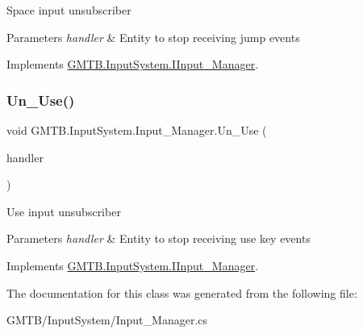 Space input unsubscriber 


\begin{DoxyParams}{Parameters}
{\em handler} & Entity to stop receiving jump events\\
\hline
\end{DoxyParams}


Implements \mbox{\hyperlink{interface_g_m_t_b_1_1_input_system_1_1_i_input___manager_a65dfb3ce87176eb4fb0a0c7342a54ade}{G\+M\+T\+B.\+Input\+System.\+I\+Input\+\_\+\+Manager}}.

\mbox{\label{class_g_m_t_b_1_1_input_system_1_1_input___manager_a176df04c04e24ecb9577789c0ff03696}} 
\subsubsection{\texorpdfstring{Un\_Use()}{Un\_Use()}}
{\footnotesize\ttfamily void G\+M\+T\+B.\+Input\+System.\+Input\+\_\+\+Manager.\+Un\+\_\+\+Use (\begin{DoxyParamCaption}\item[{Event\+Handler$<$ \mbox{\hyperlink{class_g_m_t_b_1_1_input_system_1_1_input_event}{Input\+Event}} $>$}]{handler }\end{DoxyParamCaption})}



Use input unsubscriber 


\begin{DoxyParams}{Parameters}
{\em handler} & Entity to stop receiving use key events\\
\hline
\end{DoxyParams}


Implements \mbox{\hyperlink{interface_g_m_t_b_1_1_input_system_1_1_i_input___manager_a1e9eb281683c7a6b7aa1a73da1853941}{G\+M\+T\+B.\+Input\+System.\+I\+Input\+\_\+\+Manager}}.



The documentation for this class was generated from the following file\+:\begin{DoxyCompactItemize}
\item 
G\+M\+T\+B/\+Input\+System/Input\+\_\+\+Manager.\+cs\end{DoxyCompactItemize}
